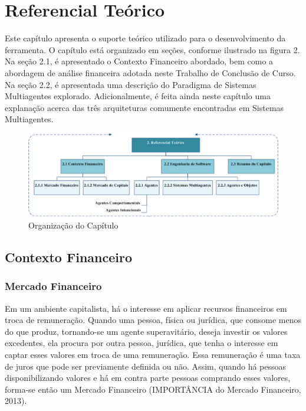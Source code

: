 
\newpage
\chapter[REFERENCIAL TEÓRICO]{Referencial Teórico}


Este capítulo apresenta o suporte teórico utilizado para o desenvolvimento da ferramenta. O capítulo está organizado em seções, conforme ilustrado na figura 2. Na seção 2.1, é apresentado o Contexto Financeiro abordado, bem como a abordagem de análise financeira adotada neste Trabalho de Conclusão de Curso. Na seção 2.2, é apresentada uma descrição do Paradigma de Sistemas Multiagentes explorado. Adicionalmente, é feita ainda neste capítulo uma explanação acerca das três arquiteturas comumente encontradas em Sistemas Multiagentes.

\begin{figure}[h!]
\centering
\label{f10}
\includegraphics[width=1\textwidth]{figuras/cap2}
\caption{Organização do Capítulo}
\end{figure}
\FloatBarrier

\section{Contexto Financeiro}
\subsection{Mercado Financeiro}

Em um ambiente capitalista, há o interesse em aplicar recursos financeiros em troca de remuneração. Quando uma pessoa, física ou jurídica, que consome menos do que produz, tornando-se um agente superavitário, deseja investir os valores excedentes, ela procura por outra pessoa, jurídica, que tenha o interesse em captar esses valores em troca de uma remuneração. Essa remuneração é uma taxa de juros que pode ser previamente definida ou não. Assim, quando há pessoas disponibilizando valores e há em contra parte pessoas comprando esses valores, forma-se então um Mercado Financeiro (IMPORTÂNCIA do Mercado Financeiro, 2013).

